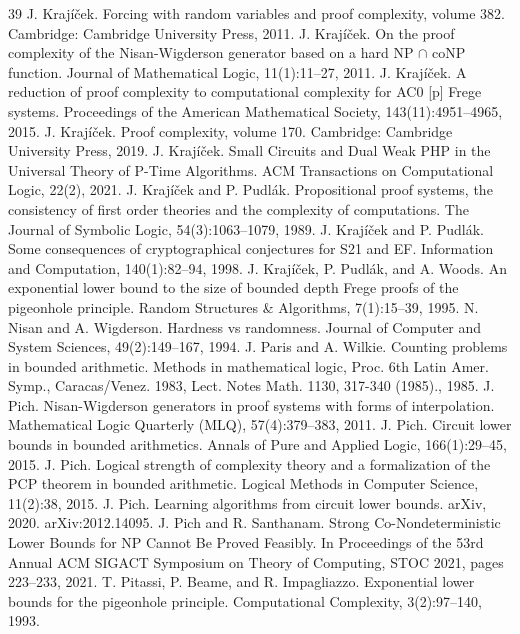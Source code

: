 \begin{thebibliography}{39}
 J. Krajíček. Forcing with random variables and proof complexity, volume 382. Cambridge: Cambridge University Press, 2011.
 J. Krajíček. On the proof complexity of the Nisan-Wigderson generator based on a hard NP $\cap$ coNP function. Journal of Mathematical Logic, 11(1):11–27, 2011.
 J. Krajíček. A reduction of proof complexity to computational complexity for AC0 [p] Frege systems. Proceedings of the American Mathematical Society, 143(11):4951–4965, 2015.
 J. Krajíček. Proof complexity, volume 170. Cambridge: Cambridge University Press, 2019.
 J. Krajíček. Small Circuits and Dual Weak PHP in the Universal Theory of P-Time Algorithms. ACM Transactions on Computational Logic, 22(2), 2021.
 J. Krajíček and P. Pudlák. Propositional proof systems, the consistency of first order theories and the complexity of computations. The Journal of Symbolic Logic, 54(3):1063–1079, 1989.
 J. Krajíček and P. Pudlák. Some consequences of cryptographical conjectures for S21 and EF. Information and Computation, 140(1):82–94, 1998.
 J. Krajíček, P. Pudlák, and A. Woods. An exponential lower bound to the size of bounded depth Frege proofs of the pigeonhole principle. Random Structures \& Algorithms, 7(1):15–39, 1995.
 N. Nisan and A. Wigderson. Hardness vs randomness. Journal of Computer and System Sciences, 49(2):149–167, 1994.
 J. Paris and A. Wilkie. Counting problems in bounded arithmetic. Methods in mathematical logic, Proc. 6th Latin Amer. Symp., Caracas/Venez. 1983, Lect. Notes Math. 1130, 317-340 (1985)., 1985.
 J. Pich. Nisan-Wigderson generators in proof systems with forms of interpolation. Mathematical Logic Quarterly (MLQ), 57(4):379–383, 2011.
 J. Pich. Circuit lower bounds in bounded arithmetics. Annals of Pure and Applied Logic, 166(1):29–45, 2015.
 J. Pich. Logical strength of complexity theory and a formalization of the PCP theorem in bounded arithmetic. Logical Methods in Computer Science, 11(2):38, 2015.
 J. Pich. Learning algorithms from circuit lower bounds. arXiv, 2020. arXiv:2012.14095.
 J. Pich and R. Santhanam. Strong Co-Nondeterministic Lower Bounds for NP Cannot Be Proved Feasibly. In Proceedings of the 53rd Annual ACM SIGACT Symposium on Theory of Computing, STOC 2021, pages 223–233, 2021.
 T. Pitassi, P. Beame, and R. Impagliazzo. Exponential lower bounds for the pigeonhole principle. Computational Complexity, 3(2):97–140, 1993.

\end{thebibliography}
